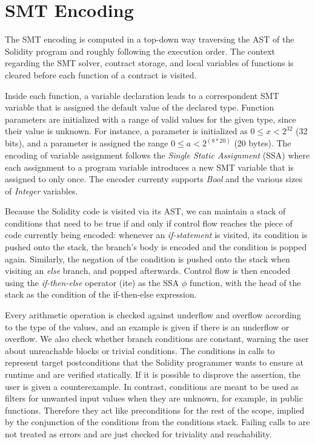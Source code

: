 \section{SMT Encoding}
\label{section:smt}


The SMT encoding is computed in a top-down way traversing the AST of the
Solidity program and roughly following the execution order.
The context regarding the SMT solver, contract storage, and
local variables of functions is cleared before each function of a contract is
visited.

Inside each function, a variable declaration leads to a correspondent SMT
variable that is assigned the default value of the declared type.
%
Function parameters are initialized with a range of valid values for the given
type, since their value is unknown.  For instance, a parameter 
is initialized as $0 \le x < 2^{32}$ (32 bits), and a parameter  is assigned the range $0 \le a < 2^{(8*20)}$ (20 bytes).
%
The encoding of variable assignment follows the \emph{Single Static Assignment}
(SSA) where each assignment to a program variable introduces a new SMT variable
that is assigned to only once.
%
The encoder currenty supports \emph{Bool} and the various sizes of
\emph{Integer} variables.

Because the Solidity code is visited via its AST, we can maintain a stack of
conditions that need to be true if and only if control flow
reaches the piece of code currently being encoded: whenever an
\emph{if-statement} is visited, its condition is pushed onto the stack, the
branch's body is encoded and the condition is popped again.
%
Similarly, the negation of the condition is pushed onto the stack when visiting
an \emph{else} branch, and popped afterwards.
%
Control flow is then encoded using the \emph{if-then-else} operator (ite) as
the SSA $\phi$ function, with the head of the stack as the condition of the
if-then-else expression.

Every arithmetic operation is checked against underflow and overflow according
to the type of the values, and an example is given if there is an underflow or
overflow.
%
We also check whether branch conditions are constant, warning the user about
unreachable blocks or trivial conditions.
%
The conditions in calls to  represent target postconditions that the
Solidity programmer wants to ensure at runtime and are verified statically.
%
If it is possible to disprove the assertion, the user is given a
counterexample.
%
In contrast,  conditions are meant to be used as
filters for unwanted input values when they are unknown, for example, in public
functions.
%
Therefore they act like preconditions for the rest of the scope, implied by the
conjunction of the conditions from the conditions stack.
%
Failing calls to  are not treated as errors and
are just checked for triviality and reachability.
%

